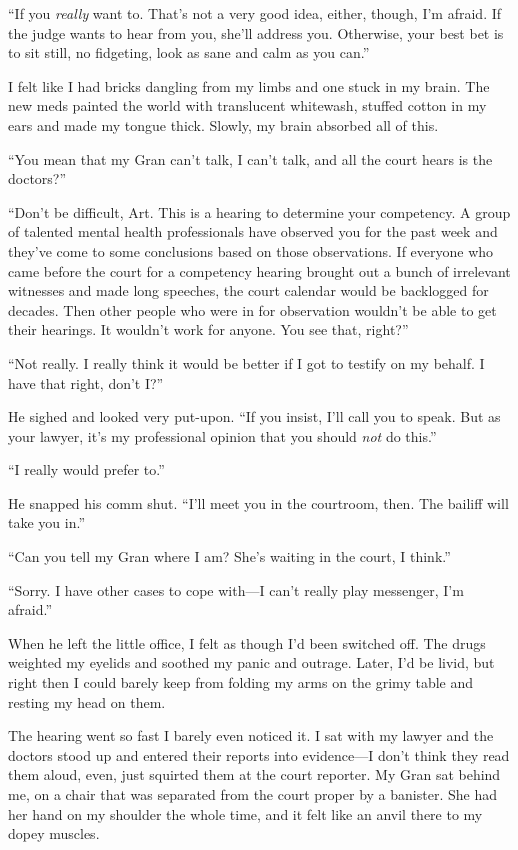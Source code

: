 “If you \emph{really} want to. That’s not a very good idea, either,
though, I’m afraid. If the judge wants to hear from you, she’ll
address you. Otherwise, your best bet is to sit still, no
fidgeting, look as sane and calm as you can.”

I felt like I had bricks dangling from my limbs and one stuck in my
brain. The new meds painted the world with translucent whitewash,
stuffed cotton in my ears and made my tongue thick. Slowly, my
brain absorbed all of this.

“You mean that my Gran can’t talk, I can’t talk, and all the court
hears is the doctors?”

“Don’t be difficult, Art. This is a hearing to determine your
competency. A group of talented mental health professionals have
observed you for the past week and they’ve come to some conclusions
based on those observations. If everyone who came before the court
for a competency hearing brought out a bunch of irrelevant
witnesses and made long speeches, the court calendar would be
backlogged for decades. Then other people who were in for
observation wouldn’t be able to get their hearings. It wouldn’t
work for anyone. You see that, right?”

“Not really. I really think it would be better if I got to testify
on my behalf. I have that right, don’t I?”

He sighed and looked very put-upon. “If you insist, I’ll call you
to speak. But as your lawyer, it’s my professional opinion that you
should \emph{not} do this.”

“I really would prefer to.”

He snapped his comm shut. “I’ll meet you in the courtroom, then.
The bailiff will take you in.”

“Can you tell my Gran where I am? She’s waiting in the court, I
think.”

“Sorry. I have other cases to cope with—I can’t really play
messenger, I’m afraid.”

When he left the little office, I felt as though I’d been switched
off. The drugs weighted my eyelids and soothed my panic and
outrage. Later, I’d be livid, but right then I could barely keep
from folding my arms on the grimy table and resting my head on
them.

The hearing went so fast I barely even noticed it. I sat with my
lawyer and the doctors stood up and entered their reports into
evidence—I don’t think they read them aloud, even, just squirted
them at the court reporter. My Gran sat behind me, on a chair that
was separated from the court proper by a banister. She had her hand
on my shoulder the whole time, and it felt like an anvil there to
my dopey muscles.

